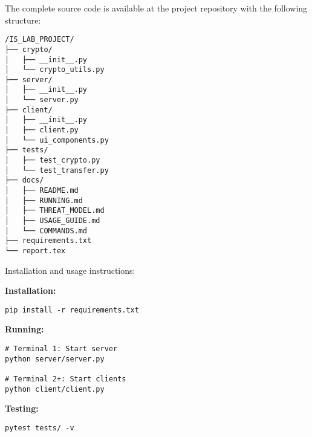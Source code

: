 \documentclass[conference]{IEEEtran}
\begin{document}

The complete source code is available at the project repository with the following structure:

\begin{verbatim}
/IS_LAB_PROJECT/
├── crypto/
│   ├── __init__.py
│   └── crypto_utils.py
├── server/
│   ├── __init__.py
│   └── server.py
├── client/
│   ├── __init__.py
│   ├── client.py
│   └── ui_components.py
├── tests/
│   ├── test_crypto.py
│   └── test_transfer.py
├── docs/
│   ├── README.md
│   ├── RUNNING.md
│   ├── THREAT_MODEL.md
│   ├── USAGE_GUIDE.md
│   └── COMMANDS.md
├── requirements.txt
└── report.tex
\end{verbatim}

Installation and usage instructions:

\textbf{Installation:}
\begin{verbatim}
pip install -r requirements.txt
\end{verbatim}

\textbf{Running:}
\begin{verbatim}
# Terminal 1: Start server
python server/server.py

# Terminal 2+: Start clients
python client/client.py
\end{verbatim}

\textbf{Testing:}
\begin{verbatim}
pytest tests/ -v
\end{verbatim}

\vspace{12pt}
\end{document}
